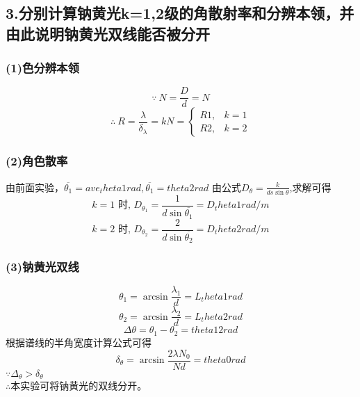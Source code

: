 \subsection*{3.分别计算钠黄光k=1,2级的角散射率和分辨本领，并由此说明钠黄光双线能否被分开}
\subsubsection*{(1)色分辨本领}
$$\because\ N = \displaystyle\frac{D}{d} = {{N}}$$
$$\therefore\ R = \displaystyle\frac{\lambda}{ {\delta}_{\lambda}} = kN = \begin{cases} {{R1}}, & k=1 \\ {{R2}} ,& k=2 \end{cases} $$
\subsubsection*{(2)角色散率}
由前面实验，$ \overline{ {\theta}_1} = {{ave_theta1}}rad, \overline{ {\theta}_1} = {{theta2}}rad$
由公式$D_{\theta} = \displaystyle\frac{k}{ds\sin{\theta}}$,求解可得\\
$$k=1\text{ \ 时,\ } D_{ {\theta}_1} = \displaystyle\frac{1}{d\sin{\overline{ {\theta}_1}}} = {{D_theta1}}rad/m$$
$$k=2\text{ \ 时,\ } D_{ {\theta}_2} = \displaystyle\frac{2}{d\sin{\overline{ {\theta}_2}}} = {{D_theta2}}rad/m$$
\subsubsection*{(3)钠黄光双线}
$${\theta}_1 = \arcsin{\frac{ {\lambda}_1}{d}} = {{L_theta1}}rad$$
$${\theta}_2 = \arcsin{\frac{ {\lambda}_2}{d}} = {{L_theta2}}rad$$
$$\Delta{\theta} = {\theta}_1 - {\theta}_2 = {{theta12}}rad$$
根据谱线的半角宽度计算公式可得
$${\delta}_{\theta} = \arcsin{\frac{2\lambda N_0}{Nd}} = {{theta0}}rad$$
$\because {\Delta}_{\theta} > {\delta}_{\theta} $ \\
$\therefore$本实验可将钠黄光的双线分开。